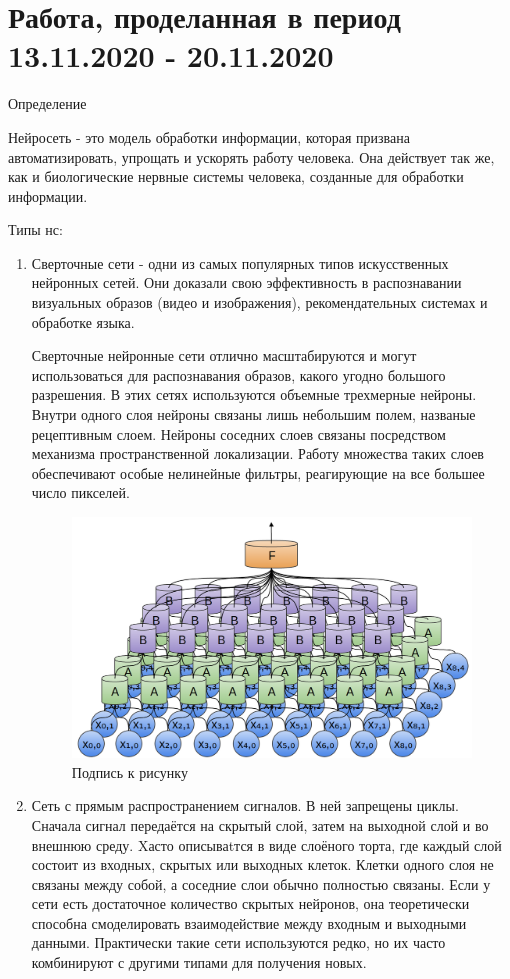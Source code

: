 \documentclass[12pt,a4paper]{report}
\begin{document}
	\section{Работа, проделанная в период 13.11.2020 - 20.11.2020}
	Определение 

Нейросеть  - это модель обработки информации, которая призвана автоматизировать, упрощать и ускорять работу человека. Она действует так же, как и биологические нервные системы человека, созданные для обработки информации. 

 Типы нс: 

\begin{enumerate}
\item Сверточные сети - одни из самых популярных типов искусственных нейронных сетей. Они доказали свою эффективность в распознавании визуальных образов (видео и изображения), рекомендательных системах и обработке языка.

Сверточные нейронные сети отлично масштабируются и могут использоваться для распознавания образов, какого угодно большого разрешения.
В этих сетях используются объемные трехмерные нейроны. Внутри одного слоя нейроны связаны лишь небольшим полем, названые рецептивным слоем.
Нейроны соседних слоев связаны посредством механизма пространственной локализации. Работу множества таких слоев обеспечивают особые нелинейные фильтры, реагирующие на все большее число пикселей.

\begin{figure}
	\centering
	\includegraphics[width=\columnwidth]{sv}
	\caption{Подпись к рисунку}
\end{figure}

\item Сеть с прямым распространением сигналов. В ней запрещены циклы. Сначала сигнал передаётся на скрытый слой, затем на выходной слой и во внешнюю среду. Xасто описываtтся в виде слоёного торта, где каждый слой состоит из входных, скрытых или выходных клеток. Клетки одного слоя не связаны между собой, а соседние слои обычно полностью связаны. Если у сети есть достаточное количество скрытых нейронов, она теоретически способна смоделировать взаимодействие между входным и выходными данными. Практически такие сети используются редко, но их часто комбинируют с другими типами для получения новых.


\end{enumerate}
\end{document}
